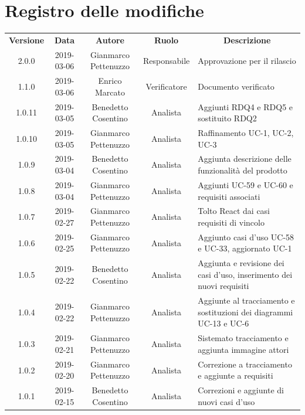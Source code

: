 \documentclass[11pt,a4paper]{article}
\begin{document}
	
	{\def\arraystretch{2}\tabcolsep=10pt
	\newpage
	\section*{\centering Registro delle modifiche}
	\begin{tabularx}{\textwidth}{ c | c | c | c | X }
		\rowcolor{LightBlue}
		\color{white}\bfseries Versione & \color{white}\bfseries Data & \color{white}\bfseries Autore & \color{white}\bfseries Ruolo & \multicolumn{1}{c}{\color{white}\bfseries Descrizione}\\[0.25cm]
		2.0.0 & 2019-03-06 & Gianmarco Pettenuzzo & Responsabile & Approvazione per il rilascio\\ \hline
		1.1.0 & 2019-03-06 & Enrico Marcato & Verificatore & Documento verificato\\ \hline
		1.0.11 & 2019-03-05 & Benedetto Cosentino & Analista & Aggiunti RDQ4 e RDQ5 e sostituito RDQ2\\ \hline
		1.0.10 & 2019-03-05 & Gianmarco Pettenuzzo & Analista & Raffinamento UC-1, UC-2, UC-3 \\ \hline
		1.0.9 & 2019-03-04 & Benedetto Cosentino & Analista & Aggiunta descrizione delle funzionalità del prodotto\\ \hline
		1.0.8 & 2019-03-04 & Gianmarco Pettenuzzo & Analista & Aggiunti UC-59 e UC-60 e requisiti associati \\ \hline
		1.0.7 & 2019-02-27 & Gianmarco Pettenuzzo & Analista & Tolto React dai casi requisiti di vincolo\\ \hline
		1.0.6 & 2019-02-25 & Gianmarco Pettenuzzo & Analista & Aggiunto casi d'uso UC-58 e UC-33, aggiornato UC-1\\ \hline
		1.0.5 & 2019-02-22 & Benedetto Cosentino & Analista & Aggiunta e revisione dei casi d'uso, inserimento dei nuovi requisiti\\ \hline
		1.0.4 & 2019-02-22 & Gianmarco Pettenuzzo & Analista & Aggiunte al tracciamento e sostituzioni dei diagrammi UC-13 e UC-6\\ \hline
		1.0.3 & 2019-02-21 & Gianmarco Pettenuzzo & Analista & Sistemato tracciamento e aggiunta immagine attori\\ \hline
		1.0.2 & 2019-02-20 & Gianmarco Pettenuzzo & Analista & Correzione a tracciamento e aggiunte a requisiti\\ \hline
		1.0.1 & 2019-02-15 & Benedetto Cosentino & Analista & Correzioni e aggiunte di nuovi casi d'uso \\ \hline

\end{tabularx}}
\end{document}
